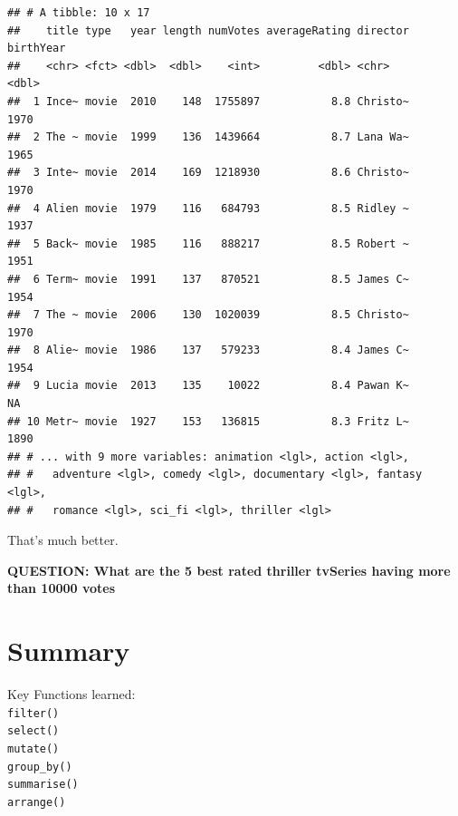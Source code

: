\documentclass[]{book}
\newenvironment{Shaded}{\begin{snugshade}}{\end{snugshade}}
\newcommand{\KeywordTok}[1]{\textcolor[rgb]{0.13,0.29,0.53}{\textbf{#1}}}
\newcommand{\NormalTok}[1]{#1}
\newcommand{\OperatorTok}[1]{\textcolor[rgb]{0.81,0.36,0.00}{\textbf{#1}}}
\newcommand{\StringTok}[1]{\textcolor[rgb]{0.31,0.60,0.02}{#1}}
\begin{document}
\begin{verbatim}
## # A tibble: 10 x 17
##    title type   year length numVotes averageRating director birthYear
##    <chr> <fct> <dbl>  <dbl>    <int>         <dbl> <chr>        <dbl>
##  1 Ince~ movie  2010    148  1755897           8.8 Christo~      1970
##  2 The ~ movie  1999    136  1439664           8.7 Lana Wa~      1965
##  3 Inte~ movie  2014    169  1218930           8.6 Christo~      1970
##  4 Alien movie  1979    116   684793           8.5 Ridley ~      1937
##  5 Back~ movie  1985    116   888217           8.5 Robert ~      1951
##  6 Term~ movie  1991    137   870521           8.5 James C~      1954
##  7 The ~ movie  2006    130  1020039           8.5 Christo~      1970
##  8 Alie~ movie  1986    137   579233           8.4 James C~      1954
##  9 Lucia movie  2013    135    10022           8.4 Pawan K~        NA
## 10 Metr~ movie  1927    153   136815           8.3 Fritz L~      1890
## # ... with 9 more variables: animation <lgl>, action <lgl>,
## #   adventure <lgl>, comedy <lgl>, documentary <lgl>, fantasy <lgl>,
## #   romance <lgl>, sci_fi <lgl>, thriller <lgl>
\end{verbatim}

That's much better.

\textbf{QUESTION: What are the 5 best rated thriller tvSeries having more than 10000 votes}

\begin{Shaded}
\end{Shaded}

\hypertarget{summary}{%
\section{Summary}\label{summary}}

Key Functions learned:\\
\texttt{filter()}~\\
\texttt{select()}~\\
\texttt{mutate()}~\\
\texttt{group\_by()}~\\
\texttt{summarise()}~\\
\texttt{arrange()}
\end{document}
